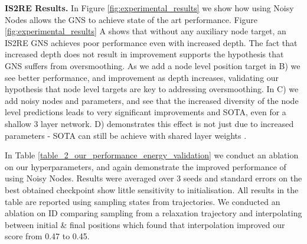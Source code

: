 \documentclass{article} \usepackage{iclr2022_conference,times}
\begin{document}
\textbf{IS2RE Results.} In Figure \ref{fig:experimental_results} we show how using Noisy Nodes allows the GNS to achieve state of the art performance. Figure \ref{fig:experimental_results} A shows that without any auxiliary node target, an IS2RE GNS achieves poor performance even with increased depth. The fact that increased depth does not result in improvement supports the hypothesis that GNS suffers from oversmoothing. As we add a node level position target in B) we see better performance, and improvement as depth increases, validating our hypothesis that node level targets are key to addressing oversmoothing. In C) we add noisy nodes and parameters, and see that the increased diversity of the node level predictions leads to very significant improvements and SOTA, even for a shallow 3 layer network. D) demonstrates this effect is not just due to increased parameters - SOTA can still be achieve with shared layer weights .

In Table \ref{table_2_our_performance_energy_validation} we conduct an ablation on our hyperparameters, and again demonstrate the improved performance of using Noisy Nodes. Results were averaged over 3 seeds and standard errors on the best obtained checkpoint show little sensitivity to initialisation. All results in the table are reported using sampling states from trajectories. We conducted an ablation on ID comparing sampling from a relaxation trajectory and interpolating between initial \& final positions which found that interpolation improved our score from 0.47 to 0.45.


\begin{table}[]
    \captionsetup{width=13cm}
    \captionsetup{justification=centering}
    \caption{OC20 ISRE Validation, eV MAE,  . \\``GNS-Shared'' indicates shared weights. ``GNS-10'' indicates a group size of 10. }
    \label{table_2_our_performance_energy_validation}
    \centering
\end{table}
\end{document}

